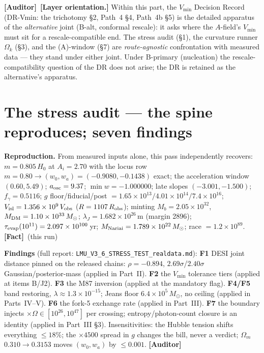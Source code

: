 \documentclass[11pt]{article}
\newcommand{\Auditor}{\textbf{\textcolor{teal!55!black}{[Auditor]}}}
\newcommand{\fact}{\textcolor{green!40!black}{\textbf{[Fact]}}}
\newcommand{\msun}{M_\odot}
\begin{document}
\noindent\Auditor\ \textbf{[Layer orientation.]} Within this part, the $V_{\min}$ Decision Record (DR-Vmin: the trichotomy \S2, Path~4 \S4, Path~4b \S5) is the detailed apparatus of the \emph{alternative} joint (B-alt, conformal rescale): it asks where the $A$-field's $V_{\min}$ must sit for a rescale-compatible end. The stress audit (\S1), the curvature runner $\Omega_k$ (\S3), and the (A)-window (\S7) are \emph{route-agnostic} confrontation with measured data --- they stand under either joint. Under B-primary (nucleation) the rescale-compatibility question of the DR does not arise; the DR is retained as the alternative's apparatus.
\section{The stress audit --- the spine reproduces; seven findings}
\textbf{Reproduction.} From measured inputs alone, this pass independently recovers: $m=0.805\,H_0$ at $A_i=2.70$ with the locus row $m=0.80\to(w_0,w_a)=(-0.9080,-0.1438)$ exact; the acceleration window $(0.60,5.49)$; $a_{\rm osc}=9.37$; $\min w=-1.000000$; late slopes $(-3.001,-1.500)$; $f_\gamma=0.5116$; $g$ floor/fiducial/post $=1.65\times10^{13}/4.01\times10^{14}/7.4\times10^{16}$; $V_{\rm isl}=1.356\times10^{9}\,V_{\rm obs}$ ($R=1107\,R_{\rm obs}$); minting $M_b=2.05\times10^{32}$, $M_{\rm DM}=1.10\times10^{33}\,\msun$; $\lambda_J=1.682\times10^{26}$\,m (margin 2896); $\tau_{\rm evap}(10^{11})=2.097\times10^{100}$\,yr; $M_{\rm Nariai}=1.789\times10^{22}\,\msun$; race $=1.2\times10^{89}$. \fact\ (this run)

\textbf{Findings} (full report: \texttt{LMU\_V3\_6\_STRESS\_TEST\_realdata.md}): \textbf{F1} DESI joint distance pinned on the released chains: $\rho=-0.894$, $2.69\sigma$/$2.40\sigma$ Gaussian/posterior-mass (applied in Part~II). \textbf{F2} the $V_{\min}$ tolerance tiers (applied at items B/J2). \textbf{F3} the M87 inversion (applied at the mandatory flag). \textbf{F4/F5} band restoring, $\lambda\approx1.3\times10^{-15}$; Jeans floor $6.4\times10^{5}\,\msun$, no ceiling (applied in Parts~IV--V). \textbf{F6} the fork-5 exchange rate (applied in Part~III). \textbf{F7} the boundary injects $\times\Omega\in[10^{26},10^{47}]$ per crossing; entropy/photon-count closure is an identity (applied in Part~III \S3). Insensitivities: the Hubble tension shifts everything $\le18\%$; the $\times4500$ spread in $g$ changes the bill, never a verdict; $\Omega_m$ $0.310\!\to\!0.3153$ moves $(w_0,w_a)$ by $\le0.001$. \Auditor
\end{document}
